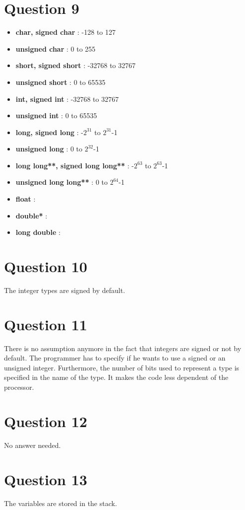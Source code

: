 \documentclass[a4paper,10pt]{article}
\begin{document}
\section*{Question 9}
\begin{itemize}
 \item \textbf{char, signed char} : -128 to 127
 \item \textbf{unsigned char} : 0 to 255
 \item \textbf{short, signed short} : -32768 to 32767
 \item \textbf{unsigned short} : 0 to 65535
 \item \textbf{int, signed int} : -32768 to 32767
 \item \textbf{unsigned int} : 0 to 65535
 \item \textbf{long, signed long} : -$2^{31}$ to $2^{31}$-1
 \item \textbf{unsigned long} : 0 to $2^{32}$-1
 \item \textbf{long long**, signed long long**} : -$2^{63}$ to $2^{63}$-1
 \item \textbf{unsigned long long**} : 0 to $2^{64}$-1
 \item \textbf{float} :
 \item \textbf{double*} :
 \item \textbf{long double} :
\end{itemize}

\section*{Question 10}
The integer types are signed by default.

\section*{Question 11}
There is no assumption anymore in the fact that integers are signed or not by default. The programmer has to specify if he wants to use a signed or an unsigned integer. Furthermore, the number of bits used to represent a type is specified in the name of the type. It makes the code less dependent of the processor.

\section*{Question 12}
No answer needed.

\section*{Question 13}
The variables are stored in the stack.
\end{document}
